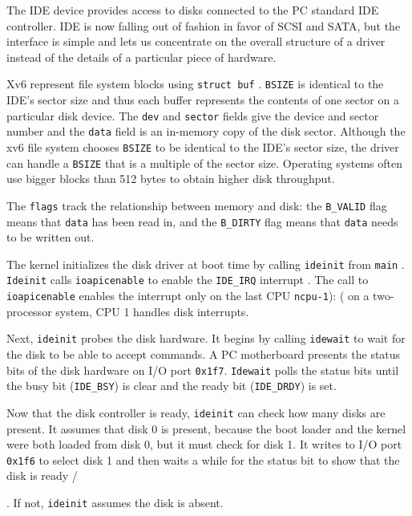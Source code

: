{The IDE device provides access to disks connected to the
PC standard IDE controller.
IDE is now falling out of fashion in favor of SCSI and SATA,
but the interface is simple and lets us concentrate on the
overall structure of a driver instead of the details of a
particular piece of hardware.

Xv6 represent file system blocks using
\lstinline{struct buf}
.
\lstinline{BSIZE}
is identical to the IDE's sector size and thus
each buffer represents the contents of one sector on a particular
disk device.  The
\lstinline{dev}
and
\lstinline{sector}
fields give the device and sector
number and the
\lstinline{data}
field is an in-memory copy of the disk sector.
Although the xv6 file system chooses
\lstinline{BSIZE}
to be identical to the IDE's sector size, the driver can handle
a
\lstinline{BSIZE}
that is a multiple of the sector size. Operating systems often use
bigger blocks than 512 bytes to obtain higher disk throughput.

The
\lstinline{flags}
track the relationship between memory and disk:
the
\lstinline{B_VALID}
flag means that
\lstinline{data}
has been read in, and
the 
\lstinline{B_DIRTY} 
flag means that
\lstinline{data}
needs to be written out.

The kernel initializes the disk driver at boot time by calling
\lstinline{ideinit}
from
\lstinline{main}
.
\lstinline{Ideinit}
calls
\lstinline{ioapicenable}
to enable the
\lstinline{IDE_IRQ}
interrupt
.
The call to
\lstinline{ioapicenable}
enables the interrupt only on the last CPU
\lstinline{ncpu-1}): (
on a two-processor system, CPU 1 handles disk interrupts.

Next,
\lstinline{ideinit}
probes the disk hardware.
It begins by calling
\lstinline{idewait}
to wait for the disk to
be able to accept commands.
A PC motherboard presents the status bits of the disk hardware on I/O port
\texttt{0x1f7}.
\lstinline{Idewait}
polls the status bits until the busy bit
(\lstinline{IDE_BSY})
is clear and the ready bit
(\lstinline{IDE_DRDY})
is set.

Now that the disk controller is ready,
\lstinline{ideinit}
can check how many disks
are present.
It assumes that disk 0 is present,
because the boot loader and the kernel
were both loaded from disk 0,
but it must check for disk 1.
It writes to I/O port
\texttt{0x1f6}
to select disk 1
and then waits a while for the status bit to show
that the disk is ready
/}.
If not, 
\lstinline{ideinit}
assumes the disk is absent.

